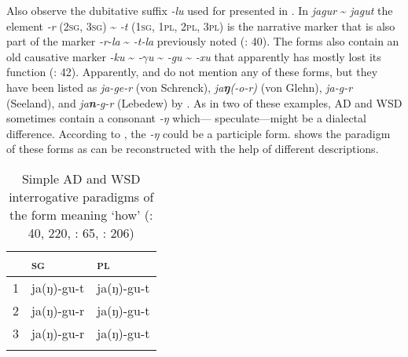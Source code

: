 Also observe the dubitative suffix \textit{-lu} used for  presented in . In \textit{jagur} {\textasciitilde} \textit{jagut} the element \textit{-r} (2\textsc{sg}, 3\textsc{sg}) {\textasciitilde} \textit{-t} (1\textsc{sg}, 1\textsc{pl, 2pl, 3pl}) is the narrative  marker that is also part of the  marker \textit{-r-la} {\textasciitilde} \textit{-t-la} previously noted (\citealt{NedjalkovOtaina2013}: 40). The forms also contain an old causative marker \textit{-ku} {\textasciitilde} \textit{-$\gamma $u} {\textasciitilde} \textit{-gu} {\textasciitilde} \textit{-xu} that apparently has mostly lost its function (\citealt{NedjalkovOtaina2013}: 42). Apparently, \citet{Gruzdeva1998} and \citet{Mattissen2003} do not mention any of these forms, but they have been listed as \textit{ja-ge-r} (von Schrenck), \textit{ja}\textbf{\textit{ŋ}}\textit{(-o-r)} (von Glehn), \textit{ja-g-r} (Seeland), and \textit{ja}\textbf{\textit{n}}\textit{-g-r} (Lebedew) by \citet{Grube1892}. As in two of these examples, AD and WSD sometimes contain a consonant \textit{-ŋ} which---\citet[87]{NedjalkovOtaina2013} speculate---might be a dialectal difference. According to \citet[81]{Fortescue2016}, the \textit{-ŋ} could be a participle form.  shows the paradigm of these forms as can be reconstructed with the help of different descriptions.

\begin{table}
\caption{Simple AD and WSD interrogative paradigms of the form meaning ‘how’ (\citealt{NedjalkovOtaina2013}: 40, 220, \citealt{Shiraishi2006}: 65, \citealt{ShiraishiTangiku2013}: 206)}
\label{tab:amur:3}

\begin{tabularx}{\textwidth}{XXl}
\lsptoprule
& \textbf{\textsc{sg}} & \textbf{\textsc{pl}}\\
\midrule
1 & ja(ŋ)-gu-t & ja(ŋ)-gu-t\\
2 & ja(ŋ)-gu-r & ja(ŋ)-gu-t\\
3 & ja(ŋ)-gu-r & ja(ŋ)-gu-t\\
\lspbottomrule
\end{tabularx}
\end{table}

